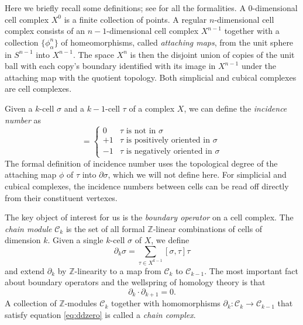 \documentclass[twocolumn]{article}
\begin{document}
Here we briefly recall some definitions; see \cite{hatcher2002algebraic} for all the formalities.
A 0-dimensional cell complex $X^0$ is a finite collection of points.
A regular $n$-dimensional cell complex consists of an $n - 1$-dimensional cell complex $X^{n - 1}$ together with a collection $\{\phi_\alpha^n\}$ of homeomorphisms, called \emph{attaching maps}, from the unit sphere in $S^{n - 1}$ into $X^{n - 1}$.
The space $X^n$ is then the disjoint union of copies of the unit ball with each copy's boundary identified with its image in $X^{n - 1}$ under the attaching map with the quotient topology.
Both simplicial and cubical complexes are cell complexes.

Given a $k$-cell $\sigma$ and a $k - 1$-cell $\tau$ of a complex $X$, we can define the \emph{incidence number} as
\begin{equation}
    [\sigma, \tau] = \begin{cases}0 & \tau\text{ is not in }\sigma \\ +1 & \tau \text{ is positively oriented in }\sigma \\ -1 & \tau\text{ is negatively oriented in }\sigma\end{cases}
\end{equation}
The formal definition of incidence number uses the topological degree of the attaching map $\phi$ of $\tau$ into $\partial\sigma$, which we will not define here.
For simplicial and cubical complexes, the incidence numbers between cells can be read off directly from their constituent vertexes.

The key object of interest for us is the \emph{boundary operator} on a cell complex.
The \emph{chain module} $\mathscr{C}_k$ is the set of all formal $\mathbb{Z}$-linear combinations of cells of dimension $k$.
Given a single $k$-cell $\sigma$ of $X$, we define
\begin{equation}
    \partial_k\sigma = \sum_{\tau \in X^{k - 1}}[\sigma, \tau]\tau
\end{equation}
and extend $\partial_k$ by $\mathbb{Z}$-linearity to a map from $\mathscr{C}_k$ to $\mathscr{C}_{k - 1}$.
The most important fact about boundary operators and the wellspring of homology theory is that
\begin{equation}
    \partial_k\cdot\partial_{k + 1} = 0.
    \label{eq:ddzero}
\end{equation}
A collection of $\mathbb{Z}$-modules $\mathscr{C}_k$ together with homomorphisms $\partial_k : \mathscr{C}_k \to \mathscr{C}_{k - 1}$ that satisfy equation \eqref{eq:ddzero} is called a \emph{chain complex}.
\end{document}
